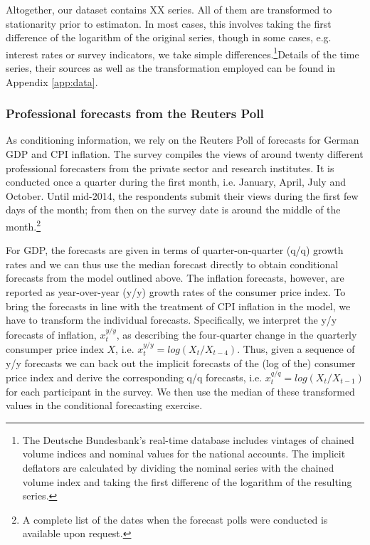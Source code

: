 \documentclass[notitlepage,a4paper,12pt]{article}
\begin{document}
Altogether, our dataset contains XX series. All of them are transformed to stationarity prior to estimaton. In most cases, this involves taking the first difference of the logarithm of the original series, though in some cases, e.g. interest rates or survey indicators, we take simple differences.\footnote{The Deutsche Bundesbank's real-time database includes vintages of chained volume indices and nominal values for the national accounts. The implicit deflators are calculated by dividing the nominal series with the chained volume index and taking the first differenc of the logarithm of the resulting series.}Details of the time series, their sources as well as the transformation employed  can be found in Appendix \ref{app:data}.

\subsubsection{Professional forecasts from the Reuters Poll}

As conditioning information, we rely on the Reuters Poll of forecasts for German GDP and CPI inflation. The survey compiles the views of around twenty different professional forecasters from the private sector and research institutes. It is conducted once a quarter during the first month, i.e. January, April, July and October. Until mid-2014, the respondents submit their views during the first few days of the month; from then on the survey date is around the middle of the month.\footnote{A complete list of the dates when the forecast polls were conducted is available upon request.}  

For GDP, the forecasts are given in terms of quarter-on-quarter (q/q) growth rates and we can thus use the median forecast directly to obtain conditional forecasts from the model outlined above. The inflation forecasts, however, are reported as year-over-year (y/y) growth rates of the consumer price index. To bring the forecasts in line with the treatment of CPI inflation in the model, we have to transform the individual forecasts. Specifically, we interpret the y/y forecasts of inflation, $x_t^{y/y}$, as describing the four-quarter change in the quarterly consumper price index $X$, i.e. $ x_t^{y/y} = log(X_t/X_{t-4})$. Thus, given a sequence of y/y forecasts we can back out the implicit forecasts of the (log of the) consumer price index and derive the corresponding q/q forecasts, i.e. $ x_t^{q/q} = log(X_t/X_{t-1})$ for each participant in the survey. We then use the median of these transformed values in the conditional forecasting exercise.
\end{document}
